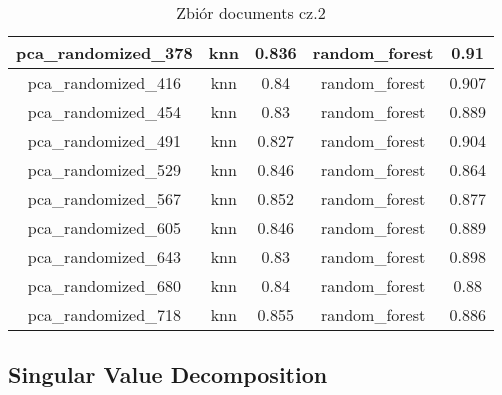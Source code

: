 \documentclass{classrep}
\begin{document}
{{{\begin{table}[!htbp]
\begin{tabular}{|c|c|c|c|c|}
                        pca\_randomized\_378 & knn & 0.836 & random\_forest & 0.91 \\ \hline
                        pca\_randomized\_416 & knn & 0.84 & random\_forest & 0.907 \\ \hline
                        pca\_randomized\_454 & knn & 0.83 & random\_forest & 0.889 \\ \hline
                        pca\_randomized\_491 & knn & 0.827 & random\_forest & 0.904 \\ \hline
                        pca\_randomized\_529 & knn & 0.846 & random\_forest & 0.864 \\ \hline
                        pca\_randomized\_567 & knn & 0.852 & random\_forest & 0.877 \\ \hline
                        pca\_randomized\_605 & knn & 0.846 & random\_forest & 0.889 \\ \hline
                        pca\_randomized\_643 & knn & 0.83 & random\_forest & 0.898 \\ \hline
                        pca\_randomized\_680 & knn & 0.84 & random\_forest & 0.88 \\ \hline
                        pca\_randomized\_718 & knn & 0.855 & random\_forest & 0.886 \\ \hline
                    \end{tabular}
                    \caption
                    {Zbiór documents cz.2}
                    \label{table_principal_component_analysis_documents_2}
                \end{table}
                \FloatBarrier

            }

        }

        \subsection{Singular Value Decomposition} {
}}
\end{document}
